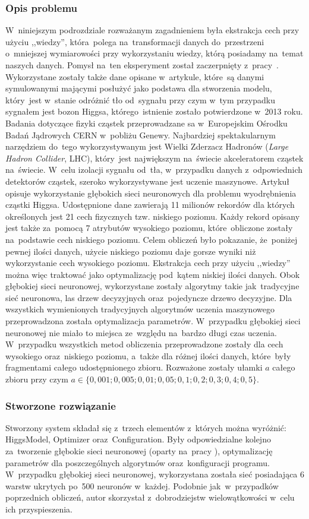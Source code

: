 \subsubsection{Opis problemu}
W~niniejszym podrozdziale rozważanym zagadnieniem była ekstrakcja cech przy użyciu ,,wiedzy'', która~polega na~transformacji danych do~przestrzeni o~mniejszej wymiarowości przy wykorzystaniu wiedzy, którą posiadamy na~temat naszych danych. Pomysł na~ten eksperyment został zaczerpnięty z~pracy~\cite{higgs1}. Wykorzystane zostały także dane opisane w~artykule, które~są danymi symulowanymi mającymi posłużyć jako podstawa dla stworzenia modelu, który~jest w~stanie odróżnić tło od~sygnału przy czym w~tym przypadku sygnałem jest bozon Higgsa, którego~istnienie zostało potwierdzone w~2013 roku. 
Badania dotyczące fizyki cząstek przeprowadzane sa  w~Europejskim Ośrodku Badań Jądrowych CERN w~pobliżu Genewy. Najbardziej spektakularnym narzędziem do~tego wykorzystywanym jest Wielki Zderzacz Hadronów (\textit{Large Hadron Collider}, LHC), który~jest największym na~świecie akceleratorem cząstek na~świecie. W~celu izolacji sygnału od~tła, w~przypadku danych z~odpowiednich detektorów cząstek, szeroko wykorzystywane jest uczenie maszynowe. Artykuł opisuje wykorzystanie głębokich sieci neuronowych dla problemu wyodrębnienia cząstki Higgsa. Udostępnione dane zawierają 11 milionów rekordów dla których określonych jest 21 cech fizycznych tzw. niskiego poziomu. Każdy rekord opisany jest także za~pomocą 7 atrybutów wysokiego poziomu, które~obliczone zostały na~podstawie cech niskiego poziomu. Celem obliczeń było pokazanie, że~poniżej pewnej ilości danych, użycie niskiego poziomu daje gorsze wyniki niż wykorzystanie cech wysokiego poziomu. Ekstrakcja cech przy użyciu ,,wiedzy'' można więc traktować jako optymalizację pod~kątem niskiej ilości danych. Obok głębokiej sieci neuronowej, wykorzystane zostały algorytmy takie jak~tradycyjne sieć neuronowa, las drzew decyzyjnych oraz~pojedyncze drzewo decyzyjne. Dla wszystkich wymienionych tradycyjnych algorytmów uczenia maszynowego przeprowadzona została optymalizacja parametrów. W~przypadku głębokiej sieci neuronowej nie miało to miejsca ze~względu na~bardzo długi czas uczenia. W~przypadku wszystkich metod obliczenia przeprowadzone zostały dla cech wysokiego oraz~niskiego poziomu, a~także dla różnej ilości danych, które~były fragmentami całego udostępnionego zbioru. Rozważone zostały ułamki $a$ całego zbioru przy czym $a\in\{0,001; 0,005; 0,01; 0,05; 0,1; 0,2; 0,3; 0,4; 0,5\}$. 

\subsubsection{Stworzone rozwiązanie}
Stworzony system składał się z~trzech elementów z~których można wyróżnić: HiggsModel, Optimizer oraz~Configuration. Były odpowiedzialne kolejno za~tworzenie głębokie sieci neuronowej (oparty na~pracy \cite{higgs2}), optymalizację parametrów dla poszczególnych algorytmów oraz~konfiguracji programu. W~przypadku głębokiej sieci neuronowej, wykorzystana została sieć posiadająca 6 warstw ukrytych po~500 neuronów w~każdej. Podobnie jak~w~przypadków poprzednich obliczeń, autor skorzystał z~dobrodziejstw wielowątkowości w~celu ich przyspieszenia.


